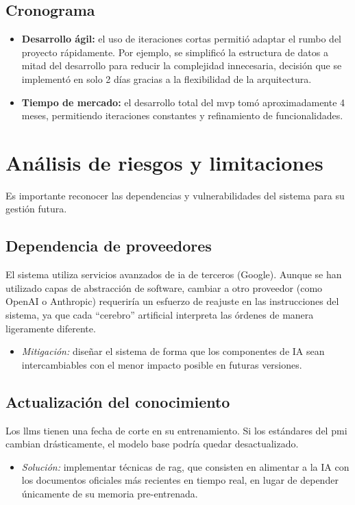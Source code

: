 \subsection{Cronograma}
\begin{itemize}
\item   \textbf{Desarrollo ágil:} el uso de iteraciones cortas permitió adaptar el rumbo del proyecto rápidamente. Por ejemplo, se simplificó la estructura de datos a mitad del desarrollo para reducir la complejidad innecesaria, decisión que se implementó en solo 2 días gracias a la flexibilidad de la arquitectura.
\item   \textbf{Tiempo de mercado:} el desarrollo total del \gls{mvp} tomó aproximadamente 4 meses, permitiendo iteraciones constantes y refinamiento de funcionalidades.
\end{itemize}

\section{Análisis de riesgos y limitaciones}

Es importante reconocer las dependencias y vulnerabilidades del sistema para su gestión futura.

\subsection{Dependencia de proveedores}
El sistema utiliza servicios avanzados de \gls{ia} de terceros (Google). Aunque se han utilizado capas de abstracción de software, cambiar a otro proveedor (como OpenAI o Anthropic) requeriría un esfuerzo de reajuste en las instrucciones del sistema, ya que cada \enquote{cerebro} artificial interpreta las órdenes de manera ligeramente diferente.
\begin{itemize}
\item   \textit{Mitigación:} diseñar el sistema de forma que los componentes de IA sean intercambiables con el menor impacto posible en futuras versiones.
\end{itemize}

\subsection{Actualización del conocimiento}
Los \glspl {llm} tienen una fecha de corte en su entrenamiento. Si los estándares del \gls{pmi} cambian drásticamente, el modelo base podría quedar desactualizado.
\begin{itemize}
\item   \textit{Solución:} implementar técnicas de \gls{rag}, que consisten en alimentar a la IA con los documentos oficiales más recientes en tiempo real, en lugar de depender únicamente de su memoria pre-entrenada.
\end{itemize}

